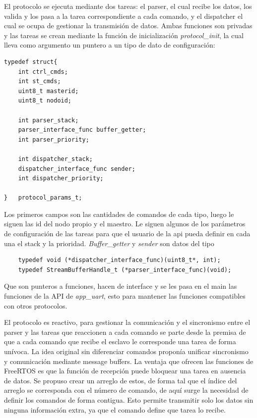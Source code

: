 El protocolo se ejecuta mediante dos tareas: el parser, el cual recibe los datos, los valida y los pasa a la tarea correspondiente a cada comando, y el dispatcher el cual se ocupa de gestionar la transmisión de datos. Ambas funciones son privadas y las tareas se crean mediante la función de inicialización \textit{protocol\_init}, la cual lleva como argumento un puntero a un tipo de dato de configuración:

\begin{minipage}{\linewidth}
\begin{lstlisting}[frame=single]
typedef struct{
	int ctrl_cmds;
	int st_cmds;
	uint8_t masterid; 
	uint8_t nodoid;
	
	int parser_stack;
	parser_interface_func buffer_getter; 
	int parser_priority;
	
	int dispatcher_stack;
	dispatcher_interface_func sender; 
	int dispatcher_priority;
	
}   protocol_params_t;
\end{lstlisting}
\end{minipage}
Los primeros campos son las cantidades de comandos de cada tipo, luego le siguen las id del nodo propio y el maestro. Le siguen algunos de los parámetros de configuración de las tareas para que el usuario de la api pueda definir en cada una el stack y la prioridad.  \textit{Buffer\_getter} y \textit{sender}  son datos del tipo 

\begin{lstlisting}
	typedef void (*dispatcher_interface_func)(uint8_t*, int);    
	typedef StreamBufferHandle_t (*parser_interface_func)(void); 
\end{lstlisting}

Que son punteros a funciones, hacen de interface y se les pasa en el main las funciones de la API de \textit{app\_uart}, esto para mantener las funciones compatibles con otros protocolos.

El protocolo es reactivo, para gestionar la comunicación y el sincronismo entre el parser y las tareas que reaccionen a cada comando se parte desde la premisa de que a cada comando que recibe el esclavo le corresponde una tarea de forma unívoca.
La idea original sin diferenciar comandos proponía unificar sincronismo y comunicación mediante message buffers.
La ventaja que ofrecen las funciones de FreeRTOS es que la función de recepción puede bloquear una tarea en ausencia de datos. Se propuso crear un arreglo de estos, de forma tal que el índice del arreglo se corresponda con el número de comando, de aquí surge la necesidad de definir los comandos de forma contigua. Esto permite transmitir solo los datos sin ninguna información extra, ya que el comando define que tarea lo recibe.

